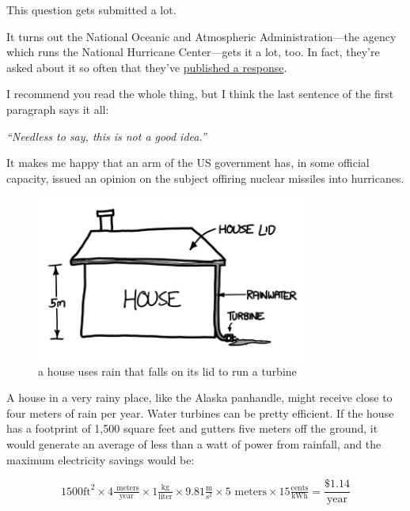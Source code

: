 {This question gets submitted a lot.}

{It turns out the National Oceanic and Atmospheric Administration—the agency which runs the National Hurricane Center—gets it a lot, too. In fact, they’re asked about it so often that they’ve \href{http://www.aoml.noaa.gov/hrd/tcfaq/C5c.html}{published a response}.}

{I recommend you read the whole thing, but I think the last sentence of the first paragraph says it all:}

{ \emph{“Needless to say, this is not a good idea.”} }

{It makes me happy that an arm of the US government has, in some official capacity, issued an opinion on the subject offiring nuclear missiles into hurricanes.}


\hfill{}

\begin{figure}[!htbp]
\centering
\includegraphics[scale=0.5, max width=0.8\textwidth]{imgs/a/23/short_damien.png}
\caption{a house uses rain that falls on its lid to run a turbine}
\end{figure}

{A house in a very rainy place, like the Alaska panhandle, might receive close to four meters of rain per year. Water turbines can be pretty efficient. If the house has a footprint of 1,500 square feet and gutters five meters off the ground, it would generate an average of less than a watt of power from rainfall, and the maximum electricity savings would be:}

{\[1500\text{ft}^2\times 4\tfrac{\text{ meters}}{\text{year}}\times1\tfrac{\text{kg}}{\text{liter}}\times9.81\tfrac{\text{m}}{\text{s}^2}\times5\text{ meters}\times15\tfrac{\text{cents}}{\text{kWh}}=\frac{\$1.14}{\text{year}}\]}

